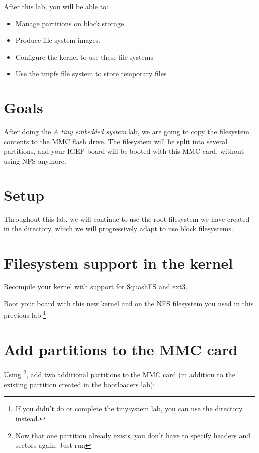 
After this lab, you will be able to:
\begin{itemize}
\item Manage partitions on block storage.
\item Produce file system images.
\item Configure the kernel to use these file systems
\item Use the tmpfs file system to store temporary files
\end{itemize}

\section{Goals}

After doing the {\em A tiny embedded system} lab, we are going to copy
the filesystem contents to the MMC flash drive. The filesystem will be
split into several partitions, and your IGEP board will be booted with
this MMC card, without using NFS anymore.

\section{Setup}

Throughout this lab, we will continue to use the root filesystem we
have created in the 
directory, which we will progressively adapt to use block filesystems.

\section{Filesystem support in the kernel}

Recompile your kernel with support for SquashFS and ext3.

Boot your board with this new kernel and on the NFS filesystem you
used in this previous lab.\footnote{If you didn't do or complete the
  tinysystem lab, you can use the  directory instead.}

\section{Add partitions to the MMC card}

Using 
\footnote{Now that one partition already exists, you don't have to specify
headers and sectors again. Just run },
add two additional partitions to the MMC card (in
addition to the existing  partition created in the
bootloaders lab):

